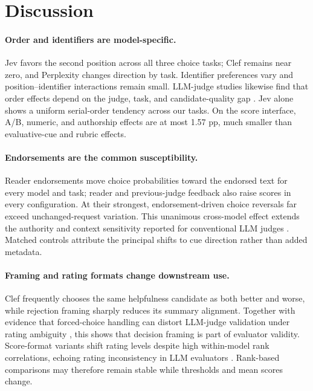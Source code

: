 \documentclass[11pt]{article}
\begin{document}


\section{Discussion}
\paragraph{Order and identifiers are model-specific.}
Jev favors the second position across all three choice tasks; Clef remains near zero, and Perplexity changes direction by task. Identifier preferences vary and position--identifier interactions remain small. LLM-judge studies likewise find that order effects depend on the judge, task, and candidate-quality gap \citep{wang-etal-2024-large-language-models-fair,shi-etal-2025-judging}. Jev alone shows a uniform serial-order tendency across our tasks. On the score interface, A/B, numeric, and authorship effects are at most 1.57 pp, much smaller than evaluative-cue and rubric effects.

\paragraph{Endorsements are the common susceptibility.}
Reader endorsements move choice probabilities toward the endorsed text for every model and task; reader and previous-judge feedback also raise scores in every configuration. At their strongest, endorsement-driven choice reversals far exceed unchanged-request variation. This unanimous cross-model effect extends the authority and context sensitivity reported for conventional LLM judges \citep{chen-etal-2024-humans}. Matched controls attribute the principal shifts to cue direction rather than added metadata.

\paragraph{Framing and rating formats change downstream use.}
Clef frequently chooses the same helpfulness candidate as both better and worse, while rejection framing sharply reduces its summary alignment. Together with evidence that forced-choice handling can distort LLM-judge validation under rating ambiguity \citep{guerdan2025indeterminacy}, this shows that decision framing is part of evaluator validity. Score-format variants shift rating levels despite high within-model rank correlations, echoing rating inconsistency in LLM evaluators \citep{stureborg2024}. Rank-based comparisons may therefore remain stable while thresholds and mean scores change.
\end{document}
